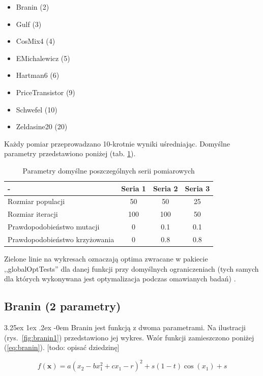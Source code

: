 \documentclass[11pt, a4paper]{article}
\makeatletter
\newcommand{\fbi}{\leavevmode{\parindent=1em\indent}}
\renewcommand\paragraph{\@startsection{paragraph}{5}{\z@}%
  {3.25ex \@plus1ex \@minus.2ex}%
  {-0em}%
  {\normalfont\normalsize\bfseries}}
\makeatother
\begin{document}
\begin{itemize}
	\item Branin (2)
	\item Gulf (3)
	\item CosMix4 (4)
	\item EMichalewicz (5)
	\item Hartman6 (6)
	\item PriceTransistor (9)
	\item Schwefel (10)
	\item Zeldasine20 (20)
\end{itemize}

\fbi
Każdy pomiar przeprowadzano 10-krotnie wyniki uśredniając. Domyślne parametry przedstawiono poniżej (tab. \ref{tab:parametry}).

\begin{table}[htbp]
	\centering
	\caption{Parametry domyślne poszczególnych serii pomiarowych}
	\label{tab:parametry}
	\begin{tabularx}{\textwidth}{|X|c|c|c|}
		\hline
		- & Seria 1 & Seria 2 & Seria 3 \\ 
		\hline
		Rozmiar populacji & 50 & 50 & 25 \\ 
		\hline 
		Rozmiar iteracji & 100 & 100 & 50 \\ 
		\hline 
		Prawdopodobieństwo mutacji & 0 & 0.1 & 0.1 \\ 
		\hline 
		Prawdopodobieństwo krzyżowania & 0 & 0.8 & 0.8 \\ 
		\hline 
	\end{tabularx} 
\end{table}

\fbi
Zielone linie na wykresach oznaczają optima zwracane w pakiecie ,,globalOptTests'' dla danej funkcji przy domyślnych ograniczeniach (tych samych dla których wykonywana jest optymalizacja podczas omawianych badań) .

\subsection{Branin (2 parametry)}
\paragraph{}
Branin jest funkcją z dwoma parametrami. Na ilustracji (rys.~\ref{fig:branin1}) przedstawiono jej wykres. Wzór funkcji zamieszczono poniżej (\ref{eq:branin}).
[todo: opisać dziedzinę]


\begin{equation}\label{eq:branin}
	f(\boldsymbol{x}) = a(x_2 - bx_1^2 + cx_1 - r)^2 + s(1 - t)\cos(x_1) + s
\end{equation}
\end{document}
